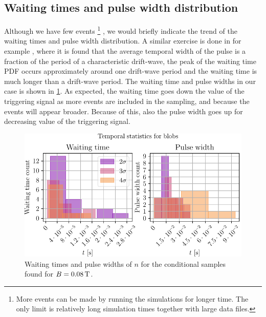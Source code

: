 \subsection{Waiting times and pulse width distribution}
%
Although we have few events
%
\footnote{
    More events can be made by running the simulations for longer time.
    The only limit is relatively long simulation times together with large data files.
}
%
, we would briefly indicate the trend of the waiting times and pulse width distribution.
A similar exercise is done in for example \cite{Hornung2011}, where it is found that the average temporal width of the pulse is a fraction of the period of a characteristic drift-wave, the peak of the waiting time PDF occurs approximately around one drift-wave period and the waiting time is much longer than a drift-wave period.
The waiting time and pulse widths in our case is shown in \cref{fig:tempStatBlob}.
As expected, the waiting time goes down the value of the triggering signal as more events are included in the sampling, and because the events will appear broader.
Because of this, also the pulse width goes up for decreasing value of the triggering signal.
%
\begin{figure}[h!]
    \begin{center}
        \includegraphics{fig/results/blobs/blobStatsB0_008Tweak}
    \end{center}
    \caption{
        Waiting times and pulse widths of $n$ for the conditional samples found for $B=0.08\, \text{T}$.
    }
    \label{fig:tempStatBlob}
\end{figure}
